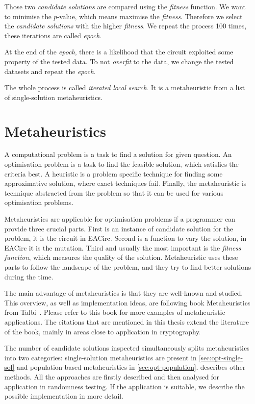 \documentclass[
    digital,    %
    oneside,    %
    color,
    11pt,
    nocover,
    notable,
    nolof,
    nolot,
]{fithesis3}
\begin{document}
Those two \textit{candidate solutions} are compared using the \textit{fitness} function. We want to minimise the $p$-value, which means maximise the \textit{fitness}. Therefore we select the \textit{candidate solutions} with the higher \textit{fitness}. We repeat the process 100 times, these iterations are called \textit{epoch}.

At the end of the \textit{epoch}, there is a likelihood that the circuit exploited some property of the tested data. To not \textit{overfit} to the data, we change the tested datasets and repeat the \textit{epoch}.%

The whole process is called \textit{iterated local search}. It is a metaheuristic from a list of single-solution metaheuristics.


\chapter{Metaheuristics}
\label{chap:metaheuristics}

A computational problem is a task to find a solution for given question. An optimisation problem is a task to find the feasible solution, which satisfies the criteria best. A heuristic is a problem specific technique for finding some approximative solution, where exact techniques fail. Finally, the metaheuristic is technique abstracted from the problem so that it can be used for various optimisation problems.

Metaheuristics are applicable for optimisation problems if a programmer can provide three crucial parts. First is an instance of candidate solution for the problem, it is the circuit in EACirc. Second is a function to vary the solution, in EACirc it is the mutation. Third and usually the most important is the \textit{fitness function}, which measures the quality of the solution. Metaheuristic uses these parts to follow the landscape of the problem, and they try to find better solutions during the time.

The main advantage of metaheuristics is that they are well-known and studied. This overview, as well as implementation ideas, are following book Metaheuristics from Talbi~\cite{talbi2009metaheuristics}. Please refer to this book for more examples of metaheuristic applications. The citations that are mentioned in this thesis extend the literature of the book, mainly in areas close to application in cryptography.

The number of candidate solutions inspected simultaneously splits metaheuristics into two categories: single-solution metaheuristics are present in \cref{sec:opt-single-sol} and population-based metaheuristics in \cref{sec:opt-population}.  describes other methods. All the approaches are firstly described and then analysed for application in randomness testing. If the application is suitable, we describe the possible implementation in more detail.
\end{document}
